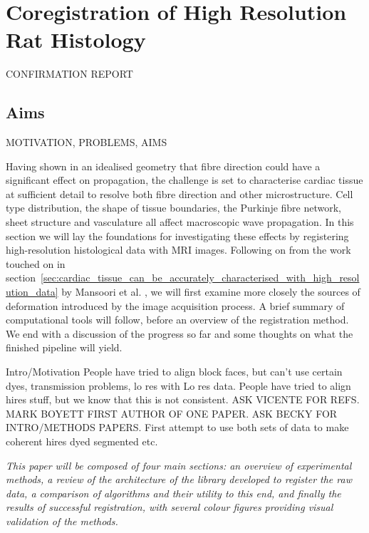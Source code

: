 \chapter{Coregistration of High Resolution Rat Histology}
\dblspace
\begin{quote}{\em }\end{quote}

CONFIRMATION REPORT
\section{Aims}
  MOTIVATION, PROBLEMS, AIMS
  
  Having shown in an idealised geometry that fibre direction could have a significant effect on propagation, the challenge is set to characterise cardiac tissue at sufficient detail to resolve both fibre direction and other microstructure. Cell type distribution, the shape of tissue boundaries, the Purkinje fibre network, sheet structure and vasculature all affect macroscopic wave propagation. In this section we will lay the foundations for investigating these effects by registering high-resolution histological data with MRI images. Following on from the work touched on in section~\ref{sec:cardiac_tissue_can_be_accurately_characterised_with_high_resolution_data} by Mansoori et al. \cite{Mansoori:2007p221}, we will first examine more closely the sources of deformation introduced by the image acquisition process. A brief summary of computational tools will follow, before an overview of the registration method. We end with a discussion of the progress so far and some thoughts on what the finished pipeline will yield.
  
  
  
  Intro/Motivation
  People have tried to align block faces, but can't use certain dyes, transmission problems, lo res with Lo res data.
  People have tried to align hires stuff, but we know that this is not consistent.
  ASK VICENTE FOR REFS. MARK BOYETT FIRST AUTHOR OF ONE PAPER. ASK BECKY FOR INTRO/METHODS PAPERS.
  First attempt to use both sets of data to make coherent hires dyed segmented etc.
  
  \emph{This paper will be composed of four main sections: an overview of experimental methods, a review of the architecture of the library developed to register the raw data, a comparison of algorithms and their utility to this end, and finally the results of successful registration, with several colour figures providing visual validation of the methods.}
  
